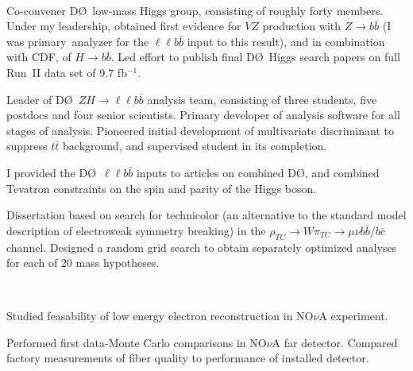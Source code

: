 \documentclass[amsmath,amssymb]{revtex4}
\def\dzero{D\O}
\begin{document}
 \\
\begin{list}{}
            {\setlength{\itemsep}{0.0in}\setlength{\parsep}{0.0in}
             \addtolength{\parskip}{-0.5in}}

\item Co-convener \dzero~low-mass Higgs group, consisting of roughly
forty members.  Under my leadership, obtained first evidence for $VZ$ production 
with $Z\to b{\bar b}$ (I was primary\ analyzer for the $\ell\ell b{\bar b}$ input to
this result), and in combination with CDF, of $H\to b{\bar b}$.  Led effort to publish
final \dzero~Higgs search papers on full Run~II data set of 9.7 fb$^{-1}$.
\item Leader of \dzero~$ZH\to\ell\ell b{\bar b}$ analysis team, consisting
of three students, five postdocs and four senior scientists.  Primary developer of
analysis software for all stages of analysis. Pioneered initial development of multivariate 
discriminant to suppress $t{\bar t}$ background, and supervised student in its completion.
\item I provided the \dzero~$\ell\ell b{\bar b}$ inputs to articles on
  combined \dzero, and combined Tevatron constraints on the spin and parity of the Higgs
  boson.
\item Dissertation based on search for technicolor (an alternative
to the standard model description of electroweak symmetry breaking) in
the $\rho_{TC} \to W \pi_{TC} \to \mu\nu b{\overline b}/ b{\overline c}$
channel.  Designed a random grid search to obtain separately optimized analyses
for each of 20 mass hypotheses.
\end{list}


\\
\begin{list}{}
            {\setlength{\itemsep}{0.0in}\setlength{\parsep}{0.0in}
             \addtolength{\parskip}{-0.5in}}
\item Studied feasability of low energy electron reconstruction in NO$\nu$A experiment.
\item Performed first data-Monte Carlo comparisons in NO$\nu$A far
  detector.  Compared factory measurements of fiber quality to
  performance of installed detector.
\end{list}
\end{document}
